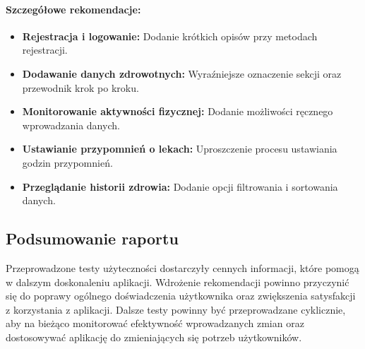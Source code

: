 \paragraph{Szczegółowe rekomendacje:}
\begin{itemize}
  \item \textbf{Rejestracja i logowanie:} Dodanie krótkich opisów przy metodach rejestracji.
  \item \textbf{Dodawanie danych zdrowotnych:} Wyraźniejsze oznaczenie sekcji oraz przewodnik krok po kroku.
  \item \textbf{Monitorowanie aktywności ﬁzycznej:} Dodanie możliwości ręcznego wprowadzania danych.
  \item \textbf{Ustawianie przypomnień o lekach:} Uproszczenie procesu ustawiania godzin przypomnień.
  \item \textbf{Przeglądanie historii zdrowia:} Dodanie opcji ﬁltrowania i sortowania danych.
\end{itemize}

\begin{center}
  \subsection{Podsumowanie raportu}
\end{center}

\quad Przeprowadzone testy użyteczności dostarczyły cennych informacji, które pomogą w dalszym doskonaleniu aplikacji. Wdrożenie rekomendacji powinno przyczynić się do poprawy ogólnego doświadczenia użytkownika oraz zwiększenia satysfakcji z korzystania z aplikacji. Dalsze testy powinny być przeprowadzane cyklicznie, aby na bieżąco monitorować efektywność wprowadzanych zmian oraz dostosowywać aplikację do zmieniających się potrzeb użytkowników.
